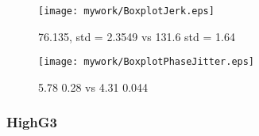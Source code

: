 \begin{comment}
CNO = 45

PLLBW =32
FLLBW = 10
76.135, std = 2.3549

PLLBW = 18
FLLBW = 1
128.26,std =  2.59 

PLLBW = 32
FLLBW = 0
131.6 std = 1.64
\end{comment}

\begin{figure}[!htb] 
    \centering
    \texttt{[image: mywork/BoxplotJerk.eps]} 
    \caption{ 76.135, std = 2.3549 vs 131.6 std = 1.64}
    \label{fig:BoxplotJerk}
\end{figure}



\begin{figure}[!htb] 
    \centering
    \texttt{[image: mywork/BoxplotPhaseJitter.eps]} 
    \caption{5.78 0.28 vs 4.31 0.044}
    \label{fig:BoxplotPhaseJitter}
\end{figure}






\clearpage

\subsubsection{HighG3}

